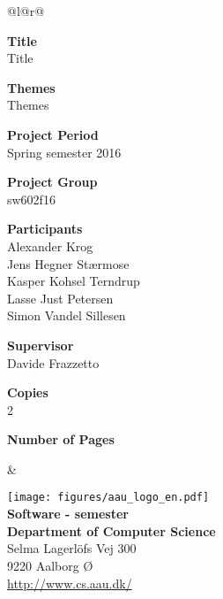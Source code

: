 
\begin{nopagebreak}
{\begin{center}
    \begin{tabular*}{\textwidth}{@{}l@{\extracolsep{\fill}}r@{}}
        \\
        \begin{minipage}[t]{0.3\textwidth}
            \textbf{Title}\\
            Title
            
            \bigskip
            \textbf{Themes}\\
            Themes

            \bigskip
            \textbf{Project Period}\\
            Spring semester 2016

            \bigskip
            \textbf{Project Group}\\
            sw602f16

            \bigskip
            \textbf{Participants}\\
            Alexander Krog\\
            Jens Hegner Stærmose\\
            Kasper Kohsel Terndrup\\
            Lasse Just Petersen\\
            Simon Vandel Sillesen
            
            \bigskip
            \textbf{Supervisor}\\
            Davide Frazzetto
            
            \bigskip
            \textbf{Copies}\\
            2 %

            \bigskip
            \textbf{Number of Pages}\\
            \pageref{LastPage}

        \end{minipage}
        &
\begin{minipage}[t]{0.6\textwidth}
\begin{flushright}
    \texttt{[image: figures/aau\_logo\_en.pdf]}\\
        \small \textbf{Software -  semester} \\
        \small \textbf{Department of Computer Science}\\
        \small Selma Lagerlöfs Vej 300 \\
        \small 9220 Aalborg Ø\\
        \small \url{http://www.cs.aau.dk/}\\
        \bigskip
            

\end{flushright}
\end{minipage}
\end{tabular*}
\end{center}}
\end{nopagebreak}
